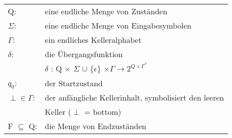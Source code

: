 \documentclass[
    border=0.2cm,
    convert={density=600}
]{standalone}
\begin{document}
\begin{tabular}{lp{11 cm}}
	Q: & eine endliche Menge von Zuständen\\
	$\Sigma$: & eine endliche Menge von Eingabesymbolen\\
	$\Gamma$: & ein endliches Kelleralphabet\\
	$\delta$: & die Übergangsfunktion\\
	&$\delta$ : Q $\times$ $\Sigma$ $\cup$ $\lbrace \epsilon\rbrace$ $\times \Gamma \to 2^{Q \times
		\Gamma^*{}}$ \\
	$q_0$:& der Startzustand\\
	$\perp \in \Gamma$: &  der anfängliche Kellerinhalt, symbolisiert den leeren\\
	& Keller ($\perp$ = bottom)\\
	F $\subseteq$ Q: & die Menge von Endzuständen
\end{tabular}
\end{document}
